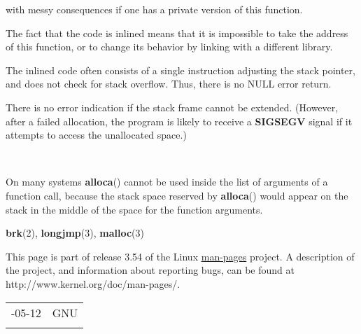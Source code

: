 \documentclass[]{article}
\let\realtextbf=\textbf
\renewcommand{\textbf}[1]{\textcolor{boldcolor}{\realtextbf{#1}}}
\renewcommand{\emph}[1]{\underline{#1}}
\begin{document}
with messy consequences if one has a private version of this function.

The fact that the code is inlined means that it is impossible to take
the address of this function, or to change its behavior by linking with
a different library.

The inlined code often consists of a single instruction adjusting the
stack pointer, and does not check for stack overflow. Thus, there is no
NULL error return.


There is no error indication if the stack frame cannot be extended.
(However, after a failed allocation, the program is likely to receive a
\textbf{SIGSEGV} signal if it attempts to access the unallocated space.)

~

On many systems \textbf{alloca}() cannot be used inside the list of
arguments of a function call, because the stack space reserved by
\textbf{alloca}() would appear on the stack in the middle of the space
for the function arguments.


\textbf{brk}(2), \textbf{longjmp}(3), \textbf{malloc}(3)


This page is part of release 3.54 of the Linux \emph{man-pages} project.
A description of the project, and information about reporting bugs, can
be found at http://www.kernel.org/doc/man-pages/.

\begin{longtable}[c]{@{}ll@{}}
\toprule\addlinespace
2013-05-12 & GNU
\\\addlinespace
\bottomrule
\end{longtable}
\end{document}
